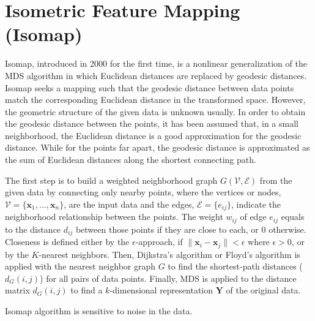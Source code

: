 \section{Isometric Feature Mapping (Isomap)\label{Sec:DR:Isomap}}
Isomap, introduced in 2000 for the first time, is a nonlinear generalization of the MDS algorithm in which Euclidean distances are replaced by geodesic distances.\cite{TenenhaumScience2000} Isomap seeks a mapping such that the geodesic distance between data points match the corresponding Euclidean distance in the transformed space. However, the geometric structure of the given data is unknown usually. In order to obtain the geodesic distance between the points, it has been assumed that, in a small neighborhood, the Euclidean distance is a good approximation for the geodesic distance. While for the points far apart, the geodesic distance is approximated as the sum of Euclidean distances along the shortest connecting path.

The first step is to build a weighted neighborhood graph $G(\mathcal{V},\mathcal{E})$ from the given data by connecting only nearby points, where the vertices or nodes, $\mathcal{V}=\{\mathbf{x}_1,\dots,\mathbf{x}_n\}$, are the input data and the edges, $\mathcal{E}=\{e_{ij}\}$, indicate the neighborhood relationship between the points. The weight $w_{ij}$ of edge $e_{ij}$ equals to the distance $d_{ij}$ between those points if they are close to each, or $0$ otherwise. Closeness is defined either by the $\epsilon$-approach, if $\lVert\mathbf{x}_i-\mathbf{x}_j\rVert<\epsilon$ where $\epsilon >0$, or by the $K$-nearest neighbors. Then, Dijkstra’s algorithm or Floyd's algorithm is applied with the nearest neighbor graph $G$ to find the shortest-path distances ($d_G(i,j)$) for all pairs of data points. Finally, MDS is applied to the distance matrix $d_G(i,j)$ to find a $k$-dimensional representation $\mathbf{Y}$ of the original data.

Isomap algorithm is sensitive to noise in the data.